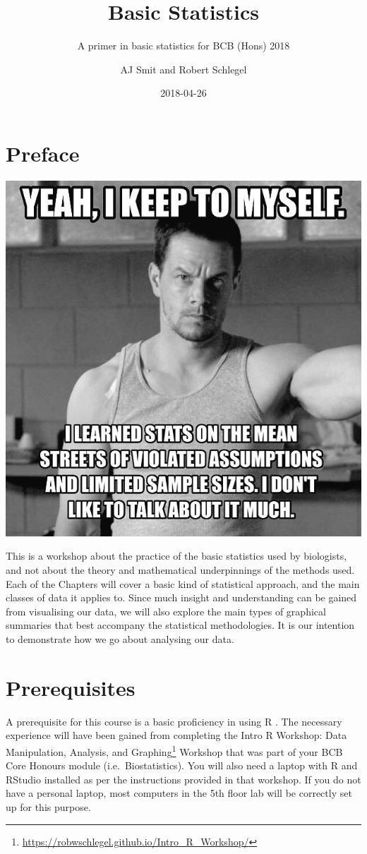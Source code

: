 \documentclass[english,10pt,a4paper,oneside]{book}
\title{Basic Statistics}
\subtitle{\sf A primer in basic statistics for BCB (Hons) 2018}
\author{AJ Smit and Robert Schlegel}
\date{2018-04-26}
\renewcommand{\href}[2]{#2\footnote{\url{#1}}}
\let\rmarkdownfootnote\footnote%
\def\footnote{\protect\rmarkdownfootnote}
\theoremstyle{definition}
\theoremstyle{definition}
\theoremstyle{definition}
\theoremstyle{remark}
\begin{document}
\maketitle



{
\hypersetup{linkcolor=black}
\setcounter{tocdepth}{2}
\tableofcontents
}



\chapter*{Preface}\label{preface}


\includegraphics[width=0.7\linewidth]{figures/walberg_assumptions}

This is a workshop about the practice of the basic statistics used by
biologists, and not about the theory and mathematical underpinnings of
the methods used. Each of the Chapters will cover a basic kind of
statistical approach, and the main classes of data it applies to. Since
much insight and understanding can be gained from visualising our data,
we will also explore the main types of graphical summaries that best
accompany the statistical methodologies. It is our intention to
demonstrate how we go about analysing our data.

\chapter*{Prerequisites}\label{prerequisites}


A prerequisite for this course is a basic proficiency in using R
\citep{R2017}. The necessary experience will have been gained from
completing the
\href{https://robwschlegel.github.io/Intro_R_Workshop/}{Intro R
Workshop: Data Manipulation, Analysis, and Graphing} Workshop that was
part of your BCB Core Honours module (i.e.~Biostatistics). You will also
need a laptop with R and RStudio installed as per the instructions
provided in that workshop. If you do not have a personal laptop, most
computers in the 5th floor lab will be correctly set up for this
purpose.
\end{document}
